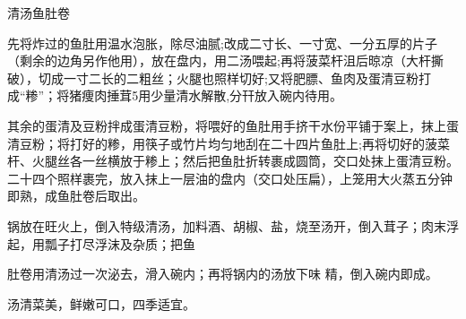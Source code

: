 \begin{recipe}{清汤鱼肚卷}

\ingredients



\cooking

\step 先将炸过的鱼肚用温水泡胀，除尽油腻;改成二寸长、一寸宽、一分五厚的片子（剩余的边角另作他用），放在盘内，用二汤喂起;再将菠菜杆沮后晾凉（大杆撕破），切成一寸二长的二粗丝；火腿也照样切好;又将肥膘、鱼肉及蛋清豆粉打成“糁”；将猪痩肉捶茸5用少量清水解散,分幵放入碗内待用。

\step 其余的蛋清及豆粉拌成蛋清豆粉，将喂好的鱼肚用手挤干水份平铺于案上，抹上蛋清豆粉；将打好的糁，用筷子或竹片均匀地刮在二十四片鱼肚上;再将切好的菠菜杆、火腿丝各一丝横放于糁上；然后把鱼肚折转裹成圆筒，交口处抹上蛋清豆粉。二十四个照样裹完，放入抹上一层油的盘内（交口处压扁），上笼用大火蒸五分钟即熟，成鱼肚卷后取出。

\step 锅放在旺火上，倒入特级清汤，加料酒、胡椒、盐，烧至汤开，倒入茸子；肉末浮起，用瓢子打尽浮沫及杂质；把鱼

肚卷用清汤过一次泌去，滑入碗内；再将锅内的汤放下味 精，倒入碗内即成。

\notes

汤清菜美，鲜嫩可口，四季适宜。

\end{recipe}

